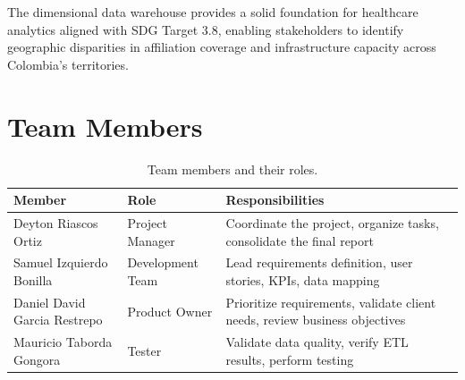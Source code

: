 \documentclass[12pt,a4paper]{article}
\begin{document}
The dimensional data warehouse provides a solid foundation for healthcare analytics aligned with SDG Target 3.8, enabling stakeholders to identify geographic disparities in affiliation coverage and infrastructure capacity across Colombia's territories.

\section*{Team Members}

\begin{table}[H]
\centering
\begin{tabular}{p{5cm} p{3.5cm} p{5cm}}
\toprule
\textbf{Member} & \textbf{Role} & \textbf{Responsibilities}\\
\midrule
Deyton Riascos Ortiz & Project Manager & Coordinate the project, organize tasks, consolidate the final report\\
Samuel Izquierdo Bonilla & Development Team & Lead requirements definition, user stories, KPIs, data mapping\\
Daniel David Garcia Restrepo & Product Owner & Prioritize requirements, validate client needs, review business objectives\\
Mauricio Taborda Gongora & Tester & Validate data quality, verify ETL results, perform testing\\
\bottomrule
\end{tabular}
\caption{Team members and their roles.}
\end{table}
\end{document}

